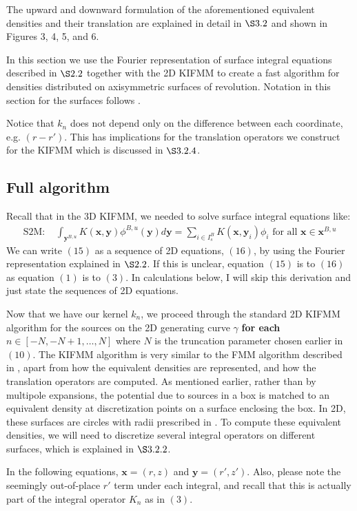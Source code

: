 \documentclass[11pt, oneside]{article}   	%
\begin{document}
The upward and downward formulation of the aforementioned equivalent densities and their translation are explained in detail in $\S3.2$ and shown in Figures 3, 4, 5, and 6.

In this section we use the Fourier representation of surface integral equations described in $\S2.2$ together with the 2D KIFMM to create a fast algorithm for densities distributed on axisymmetric surfaces of revolution. Notation in this section for the surfaces follows \cite{YBZ}.

Notice that $k_n$ does not depend only on the difference between each coordinate, e.g. $(r-r')$. This has implications for the translation operators we construct for the KIFMM which is discussed in $\S3.2.4$.

\subsection{Full algorithm}
Recall that in the 3D KIFMM, we needed to solve surface integral equations like:
\begin{align}
\mbox{S2M: }&\int_{\mathbf{y}^{B,u}}{K(\mathbf{x},\mathbf{y})}\phi^{B,u}{(\mathbf{y})}d\mathbf{y}=\sum\limits_{i\in I_s^B} K(\mathbf{x},\mathbf{y}_i)\phi_i\mbox{ for all }\mathbf{x}\in\mathbf{x}^{B,u}
\end{align}
We can write $(15)$ as a sequence of 2D equations, $(16)$, by using the Fourier representation explained in $\S2.2$. If this is unclear, equation $(15)$ is to $(16)$ as equation $(1)$ is to $(3)$. In calculations below, I will skip this derivation and just state the sequences of 2D equations.

Now that we have our kernel $k_n$, we proceed through the standard 2D KIFMM algorithm for the sources on the 2D generating curve $\gamma$ \textbf{for each} $n\in[-N,-N+1,\dots,N]$ where $N$ is the truncation parameter chosen earlier in $(10)$. The KIFMM algorithm is very similar to the FMM algorithm described in \cite{CGR}, apart from how the equivalent densities are represented, and how the translation operators are computed. As mentioned earlier, rather than by multipole expansions, the potential due to sources in a box is matched to an equivalent density at discretization points on a surface enclosing the box. In 2D, these surfaces are circles with radii prescribed in \cite{YBZ}. To compute these equivalent densities, we will need to discretize several integral operators on different surfaces, which is explained in $\S3.2.2$.

In the following equations, $\mathbf{x}=(r,z)$ and $\mathbf{y}=(r',z')$. Also, please note the seemingly out-of-place $r'$ term under each integral, and recall that this is actually part of the integral operator $K_n$ as in $(3)$.
\end{document}
